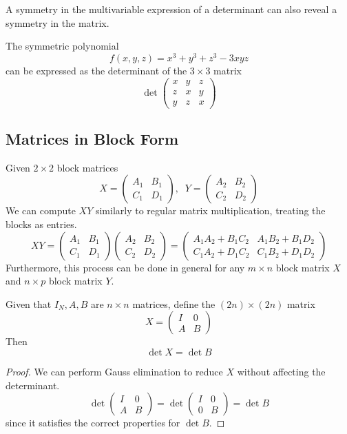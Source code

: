   A symmetry in the multivariable expression of a determinant can also reveal a symmetry in the matrix.

  \begin{example}[2019 Putnam A1]
  The symmetric polynomial 
  \[ f(x, y, z) = x^3 + y^3 + z^3 - 3 x y z\]
  can be expressed as the determinant of the $3 \times 3$ matrix
  \[\det{\begin{pmatrix}
  x&y&z\\
  z&x&y\\
  y&z&x
  \end{pmatrix}}\]
  \end{example}

\subsection{Matrices in Block Form}

  \begin{theorem}
  Given $2 \times 2$ block matrices
  \[X = \begin{pmatrix}
  A_1&B_1\\C_1&D_1
  \end{pmatrix}, \; \; Y = \begin{pmatrix}
  A_2&B_2\\C_2&D_2
  \end{pmatrix}\]
  We can compute $X Y$ similarly to regular matrix multiplication, treating the blocks as entries. 
  \[ X Y = \begin{pmatrix}
  A_1&B_1\\C_1&D_1
  \end{pmatrix} \begin{pmatrix}
  A_2&B_2\\C_2&D_2
  \end{pmatrix} = \begin{pmatrix}
  A_1 A_2 + B_1 C_2 & A_1 B_2 + B_1 D_2 \\
  C_1 A_2 + D_1 C_2 & C_1 B_2 + D_1 D_2 
  \end{pmatrix}\]
  Furthermore, this process can be done in general for any $m \times n$ block matrix $X$ and $n \times p$ block matrix $Y$. 
  \end{theorem}

  \begin{theorem}
  Given that $I_N, A, B$ are $n \times n$ matrices, define the $(2n) \times (2n)$ matrix 
  \[X = \begin{pmatrix}
  I & 0 \\ A & B
  \end{pmatrix}\]
  Then 
  \[\det{X} = \det{B}\]
  \end{theorem}
  \begin{proof}
  We can perform Gauss elimination to reduce $X$ without affecting the determinant.
  \[\det{\begin{pmatrix}
  I&0\\A&B
  \end{pmatrix}} = \det{
  \begin{pmatrix}
  I&0\\
  0&B
  \end{pmatrix}} = \det{B}\]
  since it satisfies the correct properties for $\det{B}$. 
  \end{proof}

